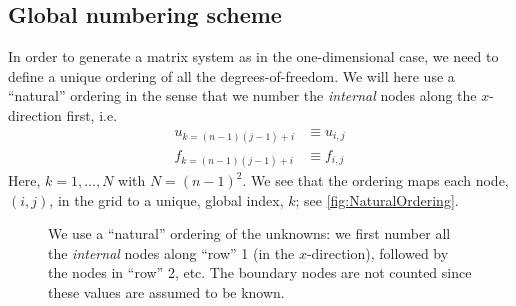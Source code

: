 \subsection{Global numbering scheme}

In order to generate a matrix system as in the one-dimensional case, we need to
define a unique ordering of all the degrees-of-freedom. We will here use a
``natural'' ordering in the sense that we number the \emph{internal} nodes along
the $x$-direction first, i.e.
\begin{align*}
  u_{k=(n-1)(j-1)+i} & \equiv u_{i,j} \\
  f_{k=(n-1)(j-1)+i} &\equiv f_{i,j}
\end{align*}
Here, $k = 1,\ldots,N$ with $N=(n-1)^2$. We see that the ordering maps each
node, $(i,j)$, in the grid to a unique, global index, $k$; see
\autoref{fig:NaturalOrdering}.

\begin{figure}
  \centering
  \caption{
    We use a ``natural'' ordering of the unknowns: we first number all the
    \emph{internal} nodes along ``row'' 1 (in the $x$-direction), followed by
    the nodes in ``row'' 2, etc. The boundary nodes are not counted since these
    values are assumed to be known.
  }
  \label{fig:NaturalOrdering}
\end{figure}

